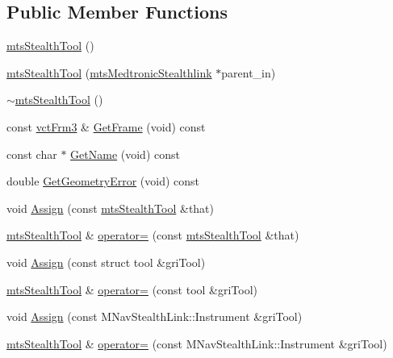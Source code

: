 \subsection*{Public Member Functions}
\begin{DoxyCompactItemize}
\item 
\hyperlink{classmts_stealth_tool_aa883de2b768f98fec69a6bc857b78323}{mts\-Stealth\-Tool} ()
\item 
\hyperlink{classmts_stealth_tool_a3b0f473d1b7b02f7861578a771bc8fc8}{mts\-Stealth\-Tool} (\hyperlink{classmts_medtronic_stealthlink}{mts\-Medtronic\-Stealthlink} $\ast$parent\-\_\-in)
\item 
\hyperlink{classmts_stealth_tool_a86b22b54518d7c3535e85e17f71d9cad}{$\sim$mts\-Stealth\-Tool} ()
\item 
const \hyperlink{vct_transformation_types_8h_a81feda0a02c2d1bc26e5553f409fed20}{vct\-Frm3} \& \hyperlink{classmts_stealth_tool_a45f638dd4baf99c685c050a87323fd82}{Get\-Frame} (void) const 
\item 
const char $\ast$ \hyperlink{classmts_stealth_tool_a99340f0661adaa23eabaf43394360164}{Get\-Name} (void) const 
\item 
double \hyperlink{classmts_stealth_tool_a83bb8e4413f625850653416e374b6fee}{Get\-Geometry\-Error} (void) const 
\item 
void \hyperlink{classmts_stealth_tool_a16fe29f2e0b33e1f2249a32c3adcae4a}{Assign} (const \hyperlink{classmts_stealth_tool}{mts\-Stealth\-Tool} \&that)
\item 
\hyperlink{classmts_stealth_tool}{mts\-Stealth\-Tool} \& \hyperlink{classmts_stealth_tool_a8e34fac36f9e6eb356116e06d9ab61c2}{operator=} (const \hyperlink{classmts_stealth_tool}{mts\-Stealth\-Tool} \&that)
\item 
void \hyperlink{classmts_stealth_tool_aefb688f5db9e6cb54d8af92196928b81}{Assign} (const struct tool \&gri\-Tool)
\item 
\hyperlink{classmts_stealth_tool}{mts\-Stealth\-Tool} \& \hyperlink{classmts_stealth_tool_aa727d88e875cc02aeeebfb7fcc47afdd}{operator=} (const tool \&gri\-Tool)
\item 
void \hyperlink{classmts_stealth_tool_aca8cf9986410e2b155c77b4a58faee83}{Assign} (const M\-Nav\-Stealth\-Link\-::\-Instrument \&gri\-Tool)
\item 
\hyperlink{classmts_stealth_tool}{mts\-Stealth\-Tool} \& \hyperlink{classmts_stealth_tool_a8a9407407b9126f0195af0a4abe945c5}{operator=} (const M\-Nav\-Stealth\-Link\-::\-Instrument \&gri\-Tool)
\item 

\end{DoxyCompactItemize}
